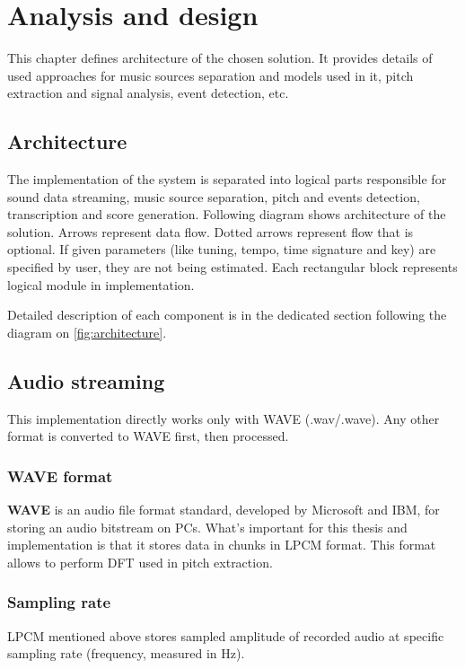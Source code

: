 \chapter{Analysis and design}\label{ch:analysis-and-design}

This chapter defines architecture of the chosen solution. It provides details of used approaches for music sources
separation and models used in it, pitch extraction and signal analysis, event detection, etc.

\section{Architecture}\label{sec:architecture}

The implementation of the system is separated into logical parts responsible for sound data streaming, music source
separation, pitch and events detection, transcription and score generation. Following diagram shows architecture of
the solution. Arrows represent data flow. Dotted arrows represent flow that is optional. If given parameters (like
tuning, tempo, time signature and key) are specified by user, they are not being estimated. Each rectangular block
represents logical module in implementation.

Detailed description of each component is in the dedicated section following the diagram on \cref{fig:architecture}.


\section{Audio streaming}\label{sec:audio-streaming}

This implementation directly works only with \ac{WAVE} (.wav/.wave). Any other format is converted to WAVE first,
then processed.

\subsection{WAVE format}\label{subsec:wave-format}
\textbf{WAVE} is an audio file format standard, developed by Microsoft and IBM, for storing an audio bitstream on PCs.
What's important for this thesis and implementation is that it stores data in chunks in \ac{LPCM} format. This format
allows to perform \ac{DFT} used in pitch extraction.

\subsection{Sampling rate}\label{subsec:sampling-rate}
\ac{LPCM} mentioned above stores sampled amplitude of recorded audio at specific sampling rate (frequency, measured in
Hz).

